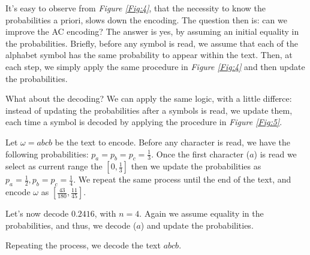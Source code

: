 \documentclass{subfiles}
\begin{document}
    It's easy to observe from \emph{Figure \ref{Fig:4}}, 
    that the necessity to know the probabilities a priori,
    slows down the encoding. 
    The question then is: can we improve the AC encoding? 
    The answer is yes, by assuming an initial equality in the probabilities.
    Briefly, before any symbol is read, 
    we assume that each of the alphabet symbol has the same probability to appear within the text.
    Then, at each step, we simply apply the same procedure in \emph{Figure \ref{Fig:4}}
    and then update the probabilities.

    What about the decoding? We can apply the same logic, with a little differce:
    instead of updating the probabilities after a symbols is read, we update them,
    each time a symbol is decoded by applying the procedure in \emph{Figure \ref{Fig:5}}.

    \begin{example*}
        Let \(\omega = abcb\) be the text to encode. 
        Before any character is read, we have the following probabilities: 
        \(p_{a} = p_{b} = p_{c} = \tfrac{1}{3}\).
        Once the first character (\(a\)) is read we select as current range 
        the \([0, \tfrac{1}{3}]\) then we update the probabilities as 
        \(p_{a} = \tfrac{1}{2}, p_{b} = p_{c} = \tfrac{1}{4}\).
        We repeat the same process until the end of the text,
            and encode \(\omega\) as \([\tfrac{43}{180}, \tfrac{11}{45}]\).
        

        Let's now decode \(0.2416\), with \(n = 4\).
        Again we assume equality in the probabilities, 
            and thus, we decode (\(a\)) and update the probabilities.
        
        Repeating the process, we decode the text \(abcb\).
    \end{example*}
\end{document}
